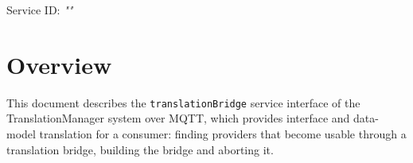 \documentclass[a4paper]{arrowhead}
\begin{document}
\sloppy

\ArrowheadSetup

\begin{center}
  \vspace*{1cm}
  \huge{\arrowtitle}

  \vspace*{0.2cm}
  \LARGE{\arrowtype}
  \vspace*{1cm}

  \Large{Service ID: \textit{"\arrowid"}}

  \vspace*{\fill}


  \vspace*{1cm}
  \vspace*{\fill}

  \begin{abstract}
    This document describes the MQTT protocol with TLS payload security and JSON payload encoding variant of the \texttt{translationBridge} service of the TranslationManager system.
  \end{abstract}

  \vspace*{1cm}
\end{center}

\newpage

\tableofcontents
\newpage

\section{Overview}
\label{sec:overview}

This document describes the \texttt{translationBridge} service interface of the TranslationManager system over MQTT, which provides interface and data-model translation for a consumer: finding providers that become usable through a translation bridge, building the bridge and aborting it.
\end{document}
